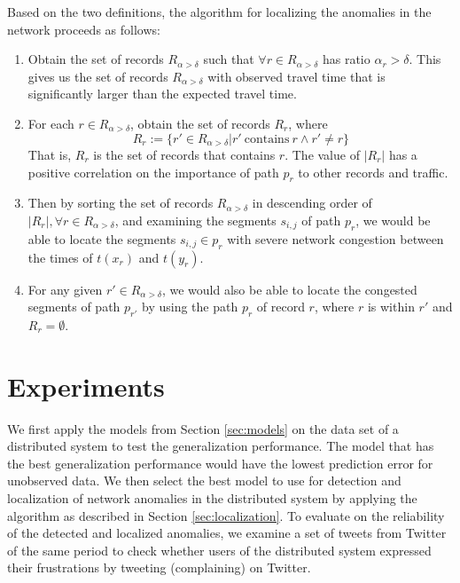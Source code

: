 \documentclass[conference]{IEEEtran.1.8}
\begin{document}
Based on the two definitions, the algorithm for localizing the anomalies in the network proceeds as follows:
\begin{enumerate}
	\item Obtain the set of records $R_{\alpha > \delta}$ such that $\forall r \in R_{\alpha > \delta}$ has ratio $\alpha_r > \delta$. This gives us the set of records $R_{\alpha > \delta}$ with observed travel time that is significantly larger than the expected travel time.
	\item For each $r \in R_{\alpha > \delta}$, obtain the set of records $R_r$, where
	\[ R_{r} := \{ r' \in R_{\alpha > \delta} | r' ~ \text{contains} ~ r \land r' \neq r \} \]
	That is, $R_r$ is the set of records that contains $r$. The value of $|R_r|$ has a positive correlation on the importance of path $p_r$ to other records and traffic.
	\item Then by sorting the set of records $R_{\alpha > \delta}$ in descending order of $|R_r|, \forall r \in R_{\alpha > \delta}$, and examining the segments $s_{i,j}$ of path $p_r$, we would be able to locate the segments $s_{i,j} \in p_r$ with severe network congestion between the times of $t(x_r)$ and $t(y_r)$.
	\item For any given $r' \in R_{\alpha > \delta}$, we would also be able to locate the congested segments of path $p_{r'}$ by using the path $p_r$ of record $r$, where $r$ is within $r'$ and $R_r = \emptyset$.
\end{enumerate}

\section{Experiments}
\label{sec:experiments}

We first apply the models from Section \ref{sec:models} on the data set of a distributed system to test the generalization performance. The model that has the best generalization performance would have the lowest prediction error for unobserved data. We then select the best model to use for detection and localization of network anomalies in the distributed system by applying the algorithm as described in Section \ref{sec:localization}. To evaluate on the reliability of the detected and localized anomalies, we examine a set of tweets from Twitter of the same period to check whether users of the distributed system expressed their frustrations by tweeting (complaining) on Twitter.
\end{document}
